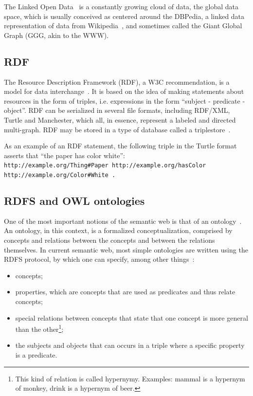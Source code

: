 \documentclass[journal,article,submit,moreauthors,pdftex]{Definitions/mdpi}
\begin{document}
The Linked Open Data~\cite{lod} is a constantly growing cloud of data,
the global data space, which is usually
conceived as centered around the DBPedia, a linked data representation
of data from Wikipedia~\cite{dbpedia0,dbpedia},
and sometimes called the Giant Global Graph (GGG, akin to the WWW).

\subsection{RDF}
The Resource Description Framework (RDF), a W3C
recommendation, is a model for data
interchange~\cite{w3cr}.
It is based on the idea of making statements about resources in the form
of triples, i.e. expressions in the form ``subject - predicate -
object''.
RDF can be serialized in several file formats, including RDF/XML,
Turtle and Manchester, which all, in essence, represent a labeled and
directed multi-graph.
RDF may be stored in a type of database called a triplestore~\cite{rdf}.

As an example of an RDF statement, the following triple in the Turtle
format asserts that ``the paper has color white'':\\
\texttt{http://example.org/Thing\#Paper http://example.org/hasColor\\
http://example.org/Color\#White .}

\subsection{RDFS and OWL ontologies}\label{sont}
One of the most important notions of the semantic web is that of an ontology~\cite{ont}.
An ontology, in this context, is a formalized conceptualization, comprised by
concepts and relations between the concepts and between the relations themselves.
In current semantic web, most simple ontologies are written using the RDFS protocol,
by which one can specify, among other things~\cite{rdfs}:
\begin{itemize}
  \item concepts;
  \item properties, which are concepts that are used as predicates and thus relate concepts;
  \item special relations between concepts that state that one concept is more general than the other\footnote{This
          kind of relation is called hypernymy. Examples: mammal is a hypernym of monkey, drink is a hypernym of beer.};
  \item the subjects and objects that can occurs in a triple where a specific property is a predicate.
\end{itemize}
\end{document}
